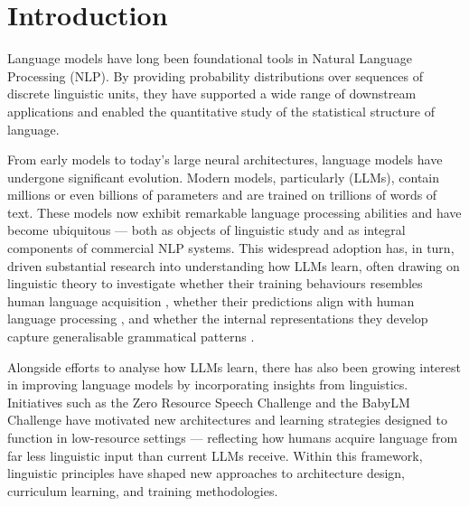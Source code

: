 \chapter{Introduction}\label{chapter:intro}



Language models have long been foundational tools in Natural Language Processing (NLP). By providing probability distributions over sequences of discrete linguistic units, they have supported a wide range of downstream applications and enabled the quantitative study of the statistical structure of language.

From early \ngram models to today's large neural architectures, language models have undergone significant evolution. Modern models, particularly  (LLMs), contain millions or even billions of parameters and are trained on trillions of words of text. These models now exhibit remarkable language processing abilities and have become ubiquitous --- both as objects of linguistic study and as integral components of commercial NLP systems. This widespread adoption has, in turn, driven substantial research into understanding how LLMs learn, often drawing on linguistic theory to investigate whether their training behaviours resembles human language acquisition \citep{evanson-2023-language}, whether their predictions align with human language processing \citep{wilcox2020predictive}, and whether the internal representations they develop capture generalisable grammatical patterns \citep{hu-etal-2020-systematic}.

Alongside efforts to analyse how LLMs learn, there has also been growing interest in improving language models by incorporating insights from linguistics. Initiatives such as the Zero Resource Speech Challenge \citep{dunbar2022self} and the BabyLM Challenge \citep{warstadt-2023-babylm-findings} have motivated new architectures and learning strategies designed to function in low-resource settings --- reflecting how humans acquire language from far less linguistic input than current LLMs receive. Within this framework, linguistic principles have shaped new approaches to architecture design, curriculum learning, and training methodologies.

